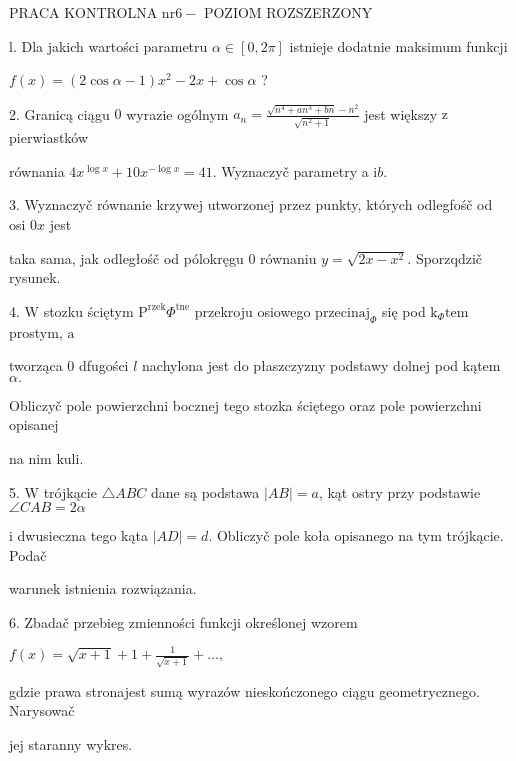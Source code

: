 \documentclass[a4paper,12pt]{article}
\begin{document}
PRACA KONTROLNA $\mathrm{n}\mathrm{r}6-$ POZIOM ROZSZERZONY

l. Dla jakich wartości parametru $\alpha\in[0,2\pi]$ istnieje dodatnie maksimum funkcji

$ f(x)=(2\cos\alpha-1)x^{2}-2x+\cos\alpha$ ?

2. Granicą ciągu $0$ wyrazie ogólnym $a_{n}=\displaystyle \frac{\sqrt{n^{4}+an^{3}+bn}-n^{2}}{\sqrt{n^{2}+1}}$ jest większy $\mathrm{z}$ pierwiastków

równania $4x^{\log x}+10x^{-\log x}=41$. Wyznaczyč parametry a $\mathrm{i}b.$

3. Wyznaczyč równanie krzywej utworzonej przez punkty, których odlegfośč od osi $0x$ jest

taka sama, jak odległośč od pólokręgu $0$ równaniu $y=\sqrt{2x-x^{2}}$. Sporzqdzič rysunek.

4. $\mathrm{W}$ stozku ściętym $\mathrm{P}^{\mathrm{r}\mathrm{z}\mathrm{e}\mathrm{k}}\Phi^{\mathrm{t}\mathrm{n}\mathrm{e}}$ przekroju osiowego $\mathrm{p}\mathrm{r}\mathrm{z}\mathrm{e}\mathrm{c}\mathrm{i}\mathrm{n}\mathrm{a}\mathrm{j}_{\Phi}$ się pod $\mathrm{k}_{\Phi}\mathrm{t}\mathrm{e}\mathrm{m}$ prostym, $\mathrm{a}$

tworząca $0$ dfugości $l$ nachylona jest do płaszczyzny podstawy dolnej pod kątem $\alpha.$

Obliczyč pole powierzchni bocznej tego stozka ściętego oraz pole powierzchni opisanej

na nim kuli.

5. $\mathrm{W}$ trójkącie $\triangle ABC$ dane są podstawa $|AB|=a$, kąt ostry przy podstawie $\angle CAB=2\alpha$

$\mathrm{i}$ dwusieczna tego kąta $|AD|=d$. Obliczyč pole koła opisanego na tym trójkącie. Podač

warunek istnienia rozwiązania.

6. Zbadač przebieg zmienności funkcji określonej wzorem

$f(x)=\displaystyle \sqrt{x+1}+1+\frac{1}{\sqrt{x+1}}+\ldots,$

gdzie prawa stronajest sumą wyrazów nieskończonego ciągu geometrycznego. Narysowač

jej staranny wykres.
\end{document}
